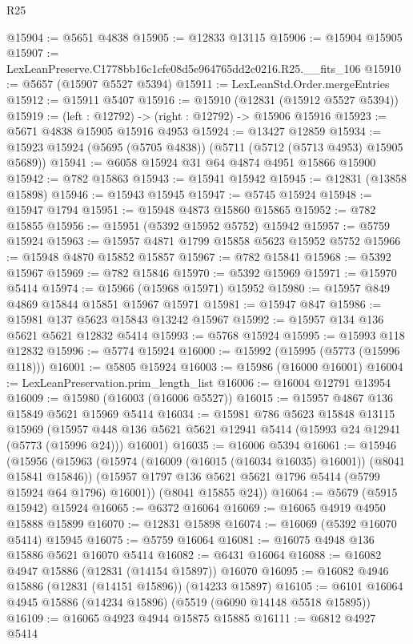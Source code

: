 \begin{lexlean}{R25}
\begin{coremodule}
@15904 := @5651 @4838
@15905 := @12833 @13115
@15906 := @15904 @15905
@15907 := LexLeanPreserve.C1778bb16c1cfe08d5e964765dd2c0216.R25.__fits_106
@15910 := @5657 (@15907 @5527 @5394)
@15911 := LexLeanStd.Order.mergeEntries
@15912 := @15911 @5407
@15916 := @15910 (@12831 (@15912 @5527 @5394))
@15919 := (left : @12792) -> (right : @12792) -> @15906 @15916
@15923 := @5671 @4838 @15905 @15916 @4953
@15924 := @13427 @12859
@15934 := @15923 @15924 (@5695 (@5705 @4838)) (@5711 (@5712 (@5713 @4953) @15905 @5689))
@15941 := @6058 @15924 @31 @64 @4874 @4951 @15866 @15900
@15942 := @782 @15863
@15943 := @15941 @15942
@15945 := @12831 (@13858 @15898)
@15946 := @15943 @15945
@15947 := @5745 @15924
@15948 := @15947 @1794
@15951 := @15948 @4873 @15860 @15865
@15952 := @782 @15855
@15956 := @15951 (@5392 @15952 @5752) @15942
@15957 := @5759 @15924
@15963 := @15957 @4871 @1799 @15858 @5623 @15952 @5752
@15966 := @15948 @4870 @15852 @15857
@15967 := @782 @15841
@15968 := @5392 @15967
@15969 := @782 @15846
@15970 := @5392 @15969
@15971 := @15970 @5414
@15974 := @15966 (@15968 @15971) @15952
@15980 := @15957 @849 @4869 @15844 @15851 @15967 @15971
@15981 := @15947 @847
@15986 := @15981 @137 @5623 @15843 @13242 @15967
@15992 := @15957 @134 @136 @5621 @5621 @12832 @5414
@15993 := @5768 @15924
@15995 := @15993 @118 @12832
@15996 := @5774 @15924
@16000 := @15992 (@15995 (@5773 (@15996 @118)))
@16001 := @5805 @15924
@16003 := @15986 (@16000 @16001)
@16004 := LexLeanPreservation.prim_length_list
@16006 := @16004 @12791 @13954
@16009 := @15980 (@16003 (@16006 @5527))
@16015 := @15957 @4867 @136 @15849 @5621 @15969 @5414
@16034 := @15981
    @786
    @5623
    @15848
    @13115
    @15969
    (@15957 @448 @136 @5621 @5621 @12941 @5414 (@15993 @24 @12941 (@5773 (@15996 @24))) @16001)
@16035 := @16006 @5394
@16061 := @15946
    (@15956
      (@15963
        (@15974 (@16009 (@16015 (@16034 @16035) @16001)) (@8041 @15841 @15846))
        (@15957 @1797 @136 @5621 @5621 @1796 @5414 (@5799 @15924 @64 @1796) @16001))
      (@8041 @15855 @24))
@16064 := @5679 (@5915 @15942) @15924
@16065 := @6372 @16064
@16069 := @16065 @4919 @4950 @15888 @15899
@16070 := @12831 @15898
@16074 := @16069 (@5392 @16070 @5414) @15945
@16075 := @5759 @16064
@16081 := @16075 @4948 @136 @15886 @5621 @16070 @5414
@16082 := @6431 @16064
@16088 := @16082 @4947 @15886 (@12831 (@14154 @15897)) @16070
@16095 := @16082 @4946 @15886 (@12831 (@14151 @15896)) (@14233 @15897)
@16105 := @6101 @16064 @4945 @15886 (@14234 @15896) (@5519 (@6090 @14148 @5518 @15895))
@16109 := @16065 @4923 @4944 @15875 @15885
@16111 := @6812 @4927 @5414

\end{coremodule}
\end{lexlean}
